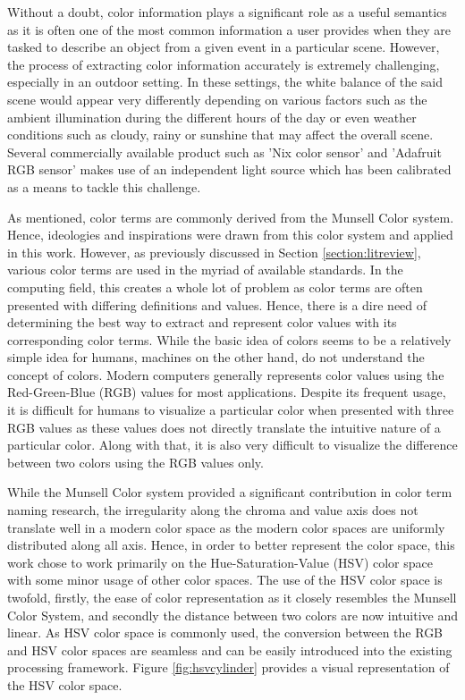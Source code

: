 Without a doubt, color information plays a significant role as a useful semantics as it is often one of the most common information a user provides when they are tasked to describe an object from a given event in a particular scene. However, the process of extracting color information accurately is extremely challenging, especially in an outdoor setting. In these settings, the white balance of the said scene would appear very differently depending on various factors such as the ambient illumination during the different hours of the day or even weather conditions such as cloudy, rainy or sunshine that may affect the overall scene. Several commercially available product such as 'Nix color sensor' \cite{nixsensorltd} and 'Adafruit RGB sensor' \cite{adafruit} makes use of an independent light source which has been calibrated as a means to tackle this challenge.


As mentioned, color terms are commonly derived from the Munsell Color system. Hence, ideologies and inspirations were drawn from this color system and applied in this work. However, as previously discussed in Section \ref{section:litreview}, various color terms are used in the myriad of available standards. In the computing field, this creates a whole lot of problem as color terms are often presented with differing definitions and values. Hence, there is a dire need of determining the best way to extract and represent color values with its corresponding color terms. While the basic idea of colors seems to be a relatively simple idea for humans, machines on the other hand, do not understand the concept of colors. Modern computers generally represents color values using the Red-Green-Blue (RGB) values for most applications. Despite its frequent usage, it is difficult for humans to visualize a particular color when presented with three RGB values as these values does not directly translate the intuitive nature of a particular color. Along with that, it is also very difficult to visualize the difference between two colors using the RGB values only. 


While the Munsell Color system provided a significant contribution in color term naming research, the irregularity along the chroma and value axis does not translate well in a modern color space as the modern color spaces are uniformly distributed along all axis. Hence, in order to better represent the color space, this work chose to work primarily on the Hue-Saturation-Value (HSV) color space with some minor usage of other color spaces. The use of the HSV color space is twofold, firstly, the ease of color representation as it closely resembles the Munsell Color System, and secondly the distance between two colors are now intuitive and linear. As HSV color space is commonly used, the conversion between the RGB and HSV color spaces are seamless and can be easily introduced into the existing processing framework. Figure \ref{fig:hsvcylinder} provides a visual representation of the HSV color space.

